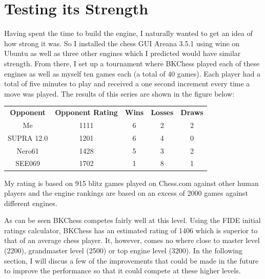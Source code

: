 \documentclass[11pt]{article}
\begin{document}
\section{Testing its Strength}
Having spent the time to build the engine, I naturally wanted to get an idea of how strong it was. So I installed the chess GUI Areana 3.5.1 using wine on Ubuntu as well as three other engines which I predicted would have similar strength. From there, I set up a tournament where BKChess played each of these engines as well as myself ten games each (a total of 40 games). Each player had a total of five minutes to play and received a one second increment every time a move was played. The results of this series are shown in the figure below:

\begin{center}
\begin{tabular}{c c c c c}
\textbf{Opponent} & \textbf{Opponent Rating} & \textbf{Wins} & \textbf{Losses} & \textbf{Draws} \\
Me         & 1111 & 6 & 2 & 2 \\
SUPRA 12.0 & 1201 & 6 & 4 & 0 \\
Nero61     & 1428 & 5 & 3 & 2 \\
SEE069     & 1702 & 1 & 8 & 1
\end{tabular}
\end{center}

My rating is based on 915 blitz games played on Chess.com against other human players and the engine rankings are based on an excess of 2000 games against different engines\cite{computerchess}.


As can be seen BKChess competes fairly well at this level. Using the FIDE initial ratings calculator, BKChess has an estimated rating of 1406 which is superior to that of an average chess player. It, however, comes no where close to master level (2200), grandmaster level (2500) or top engine level (3200). In the following section, I will discus a few of the improvements that could be made in the future to improve the performance so that it could compete at these higher levels.
\end{document}
